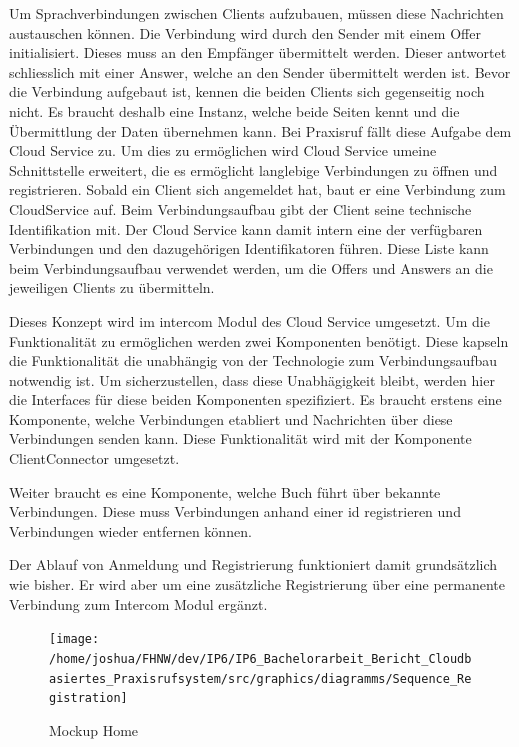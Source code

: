 Um Sprachverbindungen zwischen Clients aufzubauen, müssen diese Nachrichten austauschen können.
Die Verbindung wird durch den Sender mit einem Offer initialisiert.
Dieses muss an den Empfänger übermittelt werden.
Dieser antwortet schliesslich mit einer Answer, welche an den Sender übermittelt werden ist.
Bevor die Verbindung aufgebaut ist, kennen die beiden Clients sich gegenseitig noch nicht.
Es braucht deshalb eine Instanz, welche beide Seiten kennt und die Übermittlung der Daten übernehmen kann.
Bei Praxisruf fällt diese Aufgabe dem Cloud Service zu.
Um dies zu ermöglichen wird Cloud Service umeine Schnittstelle erweitert, die es ermöglicht langlebige Verbindungen
zu öffnen und registrieren.
Sobald ein Client sich angemeldet hat, baut er eine Verbindung zum CloudService auf.
Beim Verbindungsaufbau gibt der Client seine technische Identifikation mit.
Der Cloud Service kann damit intern eine der verfügbaren Verbindungen und den dazugehörigen Identifikatoren führen.
Diese Liste kann beim Verbindungsaufbau verwendet werden, um die Offers und Answers an die jeweiligen Clients zu übermitteln.

Dieses Konzept wird im intercom Modul des Cloud Service umgesetzt.
Um die Funktionalität zu ermöglichen werden zwei Komponenten benötigt.
Diese kapseln die Funktionalität die unabhängig von der Technologie zum Verbindungsaufbau notwendig ist.
Um sicherzustellen, dass diese Unabhägigkeit bleibt, werden hier die Interfaces für diese beiden Komponenten spezifiziert.
Es braucht erstens eine Komponente, welche Verbindungen etabliert und Nachrichten über diese Verbindungen senden kann.
Diese Funktionalität wird mit der Komponente ClientConnector umgesetzt.




\clearpage
Weiter braucht es eine Komponente, welche Buch führt über bekannte Verbindungen.
Diese muss Verbindungen anhand einer id registrieren und Verbindungen wieder entfernen können.



Der Ablauf von Anmeldung und Registrierung funktioniert damit grundsätzlich wie bisher.
Er wird aber um eine zusätzliche Registrierung über eine permanente Verbindung zum Intercom Modul ergänzt.

\begin{figure}[h]
    \centering
    \begin{minipage}[b]{0.9\textwidth}
        \texttt{[image: /home/joshua/FHNW/dev/IP6/IP6\_Bachelorarbeit\_Bericht\_Cloudbasiertes\_Praxisrufsystem/src/graphics/diagramms/Sequence\_Registration]}
        \caption{Mockup Home}
    \end{minipage}
\end{figure}



